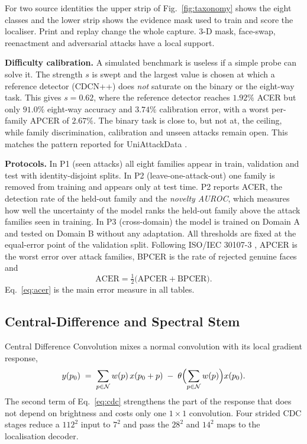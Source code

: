 \documentclass[conference]{IEEEtran}
\newcommand{\sub}[1]{\subsection{\texorpdfstring{\textbf{#1}}{#1}}}
\begin{document}
For two source identities the upper strip of Fig.~\ref{fig:taxonomy} shows the eight
classes and the lower strip shows the evidence mask used to train and score the
localiser. Print and replay change the whole capture. 3-D mask, face-swap,
reenactment and adversarial attacks have a local support.

\textbf{Difficulty calibration.} A simulated benchmark is useless if a simple probe can
solve it. The strength $s$ is swept and the largest value is chosen at which a
reference detector (CDCN++) does \emph{not} saturate on the binary or the eight-way
task. This gives $s=0.62$, where the reference detector reaches $1.92\%$ ACER but only
$91.0\%$ eight-way accuracy and $3.74\%$ calibration error, with a worst per-family
APCER of $2.67\%$. The binary task is close to, but not at, the ceiling, while family
discrimination, calibration and unseen attacks remain open. This matches the pattern
reported for UniAttackData \cite{yu2024unified}.

\textbf{Protocols.} In P1 (seen attacks) all eight families appear in train,
validation and test with identity-disjoint splits. In P2 (leave-one-attack-out) one
family is removed from training and appears only at test time. P2 reports ACER, the
detection rate of the held-out family and the \emph{novelty AUROC}, which measures how
well the uncertainty of the model ranks the held-out family above the attack families
seen in training. In P3 (cross-domain) the model is trained on Domain A and tested on
Domain B without any adaptation. All thresholds are fixed at the equal-error point of
the validation split. Following ISO/IEC 30107-3 \cite{iso30107}, APCER is the worst
error over attack families, BPCER is the rate of rejected genuine faces and
\begin{equation}
\mathrm{ACER} = \tfrac{1}{2}\bigl(\mathrm{APCER}+\mathrm{BPCER}\bigr).
\label{eq:acer}
\end{equation}
Eq.~\eqref{eq:acer} is the main error measure in all tables.

\sub{Central-Difference and Spectral Stem}
Central Difference Convolution \cite{yu2020cdcn} mixes a normal convolution with its
local gradient response,
\begin{equation}
y(p_{0}) \;=\; \sum_{p\in\mathcal{N}} w(p)\,x(p_{0}+p)
\;-\;\theta \Bigl(\sum_{p\in\mathcal{N}} w(p)\Bigr) x(p_{0}).
\label{eq:cdc}
\end{equation}
The second term of Eq.~\eqref{eq:cdc} strengthens the part of the response that does
not depend on brightness and costs only one $1\times1$ convolution. Four strided CDC
stages reduce a $112^{2}$ input to $7^{2}$ and pass the $28^{2}$ and $14^{2}$ maps to
the localisation decoder.
\end{document}
